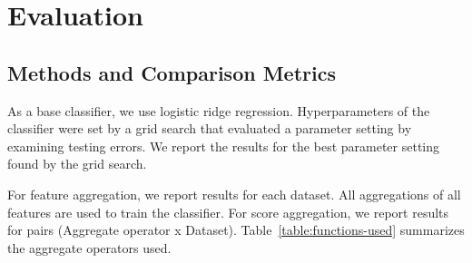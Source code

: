\documentclass[conference]{IEEEtran}
\begin{document}
%
%
%
%
%
\section{Evaluation}


\subsection{Methods and Comparison Metrics} %
As a base classifier, we use logistic ridge regression. Hyperparameters of the classifier were set by a grid search that evaluated a parameter setting by examining testing errors. We report the results for the best parameter setting found by the grid search.

For feature aggregation, we report results for each dataset. All aggregations of all features are used to train the classifier. For score aggregation, we report results for pairs (Aggregate operator x Dataset). Table~\ref{table:functions-used} summarizes the aggregate operators used.
\end{document}
